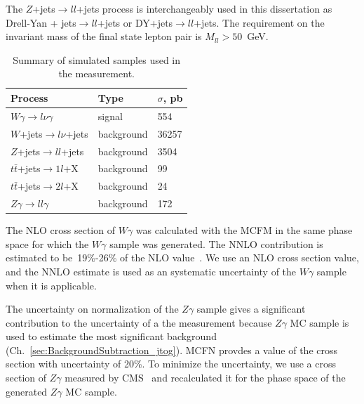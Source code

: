 The $Z$+jets$ \rightarrow ll $+jets process is interchangeably used in this dissertation as Drell-Yan + jets$ \rightarrow ll $+jets or DY+jets$ \rightarrow ll $+jets. The requirement on the invariant mass of the final state lepton pair is $M_{ll}>50$~GeV. 

\begin{table}[h]
  \small
  \begin{center}
    \caption{Summary of simulated samples used in the measurement.}
    \begin{tabular}{|l|l|l|}
      \hline
      Process                              & Type & $\sigma$, pb  \\ \hline
      $W\gamma \rightarrow l\nu\gamma$     & signal & 554   \\ \hline %
      $W$+jets$ \rightarrow l\nu $+jets   & background & 36257  \\ \hline %
      $Z$+jets$ \rightarrow ll $+jets     & background & 3504  \\ \hline %
      $t\bar{t}$+jets$\rightarrow 1l$+X    & background & 99    \\ \hline %
      $t\bar{t}$+jets$\rightarrow 2l$+X    & background & 24    \\ \hline
      $Z\gamma \rightarrow ll\gamma$       & background & 172   \\ \hline
    \end{tabular}
    \label{tab:mc_bkg_samples}
  \end{center}
\end{table} 

The NLO cross section of $W\gamma$ was calculated with the MCFM in the same phase space for which the $W\gamma$ sample was generated. The NNLO contribution is estimated to be~19\%-26\% of the NLO value~\cite{ref_theory_NNLO}. We use an NLO cross section value, and the NNLO estimate is used as an systematic uncertainty of the $W\gamma$ sample when it is applicable. 

The uncertainty on normalization of the $Z\gamma$ sample gives a significant contribution to the uncertainty of a the measurement because $Z\gamma$ MC sample is used to estimate the most significant background (Ch.~\ref{sec:BackgroundSubtraction_jtog}). MCFN provdes a value of the cross section with uncertainty of 20\%. To minimize the uncertainty, we use a cross section of $Z\gamma$ measured by CMS~\cite{ref_Zg8TeV} and recalculated it for the phase space of the generated $Z\gamma$ MC sample. 

